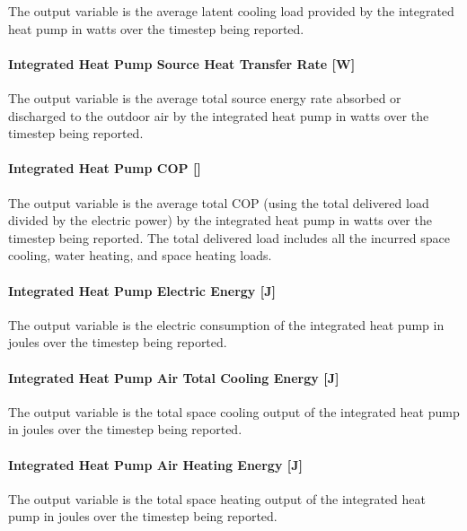 The output variable is the average latent cooling load provided by the integrated heat pump in watts over the timestep being reported.

\paragraph{Integrated Heat Pump Source Heat Transfer Rate {[}W{]}}\label{Out-Total-Source-Energy-Rate-ASIHP}

The output variable is the average total source energy rate absorbed or discharged to the outdoor air by the integrated heat pump in watts over the timestep being reported.


\paragraph{Integrated Heat Pump COP {[}{]}}\label{Out-Tot-COP-ASIHP}

The output variable is the average total COP (using the total delivered load divided by the electric power) by the integrated heat pump in watts over the timestep being reported. The total delivered load includes all the incurred space cooling, water heating, and space heating loads.


\paragraph{Integrated Heat Pump Electric Energy {[}J{]}}\label{Out-Total-Electric-Energy-ASIHP}

The output variable is the electric consumption of the integrated heat pump in joules over the timestep being reported. 


\paragraph{Integrated Heat Pump Air Total Cooling Energy {[}J{]}}\label{Out-Total-Cooling-Energy-ASIHP}
The output variable is the total space cooling output of the integrated heat pump in joules over the timestep being reported. 


\paragraph{Integrated Heat Pump Air Heating Energy {[}J{]}}\label{Out-Total-Air-Heating-Energy-ASIHP}

The output variable is the total space heating output of the integrated heat pump in joules over the timestep being reported. 


